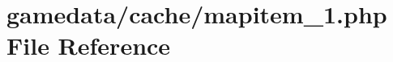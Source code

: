 \hypertarget{cache_2mapitem__1_8php}{\section{gamedata/cache/mapitem\+\_\+1.php File Reference}
\label{cache_2mapitem__1_8php}
}

